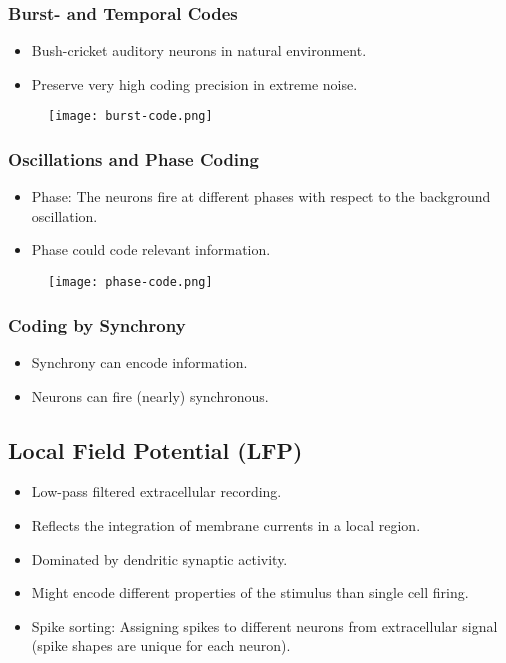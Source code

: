 \documentclass[main]{subfiles}
\begin{document}
\subsubsection{Burst- and Temporal Codes}
\begin{itemize}[noitemsep,nolistsep]
	\item Bush-cricket auditory neurons in natural environment.
	\item Preserve very high coding precision in extreme noise.
\end{itemize}
\begin{figure}[H]
	\centering
	\texttt{[image: burst-code.png]}
\end{figure}

\subsubsection{Oscillations and Phase Coding}
\begin{itemize}[noitemsep,nolistsep]
	\item Phase: The neurons fire at different phases with respect to the background oscillation.
	\item Phase could code relevant information.
\end{itemize}
\begin{figure}[H]
	\centering
	\texttt{[image: phase-code.png]}
\end{figure}

\subsubsection{Coding by Synchrony}
\begin{itemize}[noitemsep,nolistsep]
	\item Synchrony can encode information.
	\item Neurons can fire (nearly) synchronous.
\end{itemize}

\subsection{Local Field Potential (LFP)}
\begin{itemize}[noitemsep,nolistsep]
	\item Low-pass filtered extracellular recording.
	\item Reflects the integration of membrane currents in a local region.
	\item Dominated by dendritic synaptic activity.
	\item Might encode different properties of the stimulus than single cell firing.
	\item Spike sorting: Assigning spikes to different neurons from extracellular signal (spike shapes are unique for each neuron).
\end{itemize}
\end{document}
